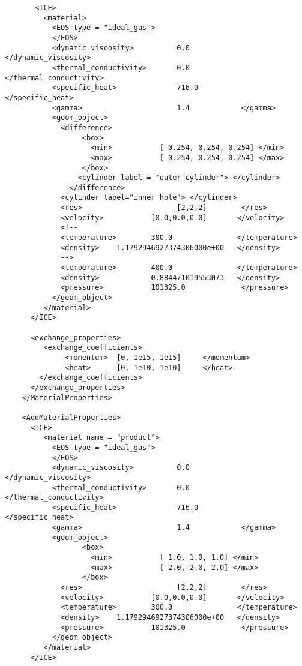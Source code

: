 \begin{lstlisting}
       <ICE>
         <material>
           <EOS type = "ideal_gas">
           </EOS>
           <dynamic_viscosity>          0.0            </dynamic_viscosity>
           <thermal_conductivity>       0.0            </thermal_conductivity>
           <specific_heat>              716.0          </specific_heat>
           <gamma>                      1.4            </gamma>
           <geom_object>
             <difference>
                  <box>
                    <min>           [-0.254,-0.254,-0.254] </min>
                    <max>           [ 0.254, 0.254, 0.254] </max>
                  </box>
                 <cylinder label = "outer cylinder"> </cylinder>
               </difference>
             <cylinder label="inner hole"> </cylinder>
             <res>                      [2,2,2]        </res>
             <velocity>           [0.0,0.0,0.0]       </velocity>
             <!--
             <temperature>        300.0               </temperature>
             <density>    1.1792946927374306000e+00   </density>
             -->
             <temperature>        400.0               </temperature>
             <density>            0.884471019553073   </density>
             <pressure>           101325.0             </pressure>
           </geom_object>
         </material>
      </ICE>       

      <exchange_properties>  
         <exchange_coefficients>
              <momentum>  [0, 1e15, 1e15]     </momentum>
              <heat>      [0, 1e10, 1e10]     </heat>
        </exchange_coefficients>
      </exchange_properties> 
    </MaterialProperties>

    <AddMaterialProperties>  
      <ICE>
         <material name = "product">
           <EOS type = "ideal_gas">
           </EOS>
           <dynamic_viscosity>          0.0            </dynamic_viscosity>
           <thermal_conductivity>       0.0            </thermal_conductivity>
           <specific_heat>              716.0          </specific_heat>
           <gamma>                      1.4            </gamma>
           <geom_object>
                  <box>
                    <min>           [ 1.0, 1.0, 1.0] </min>
                    <max>           [ 2.0, 2.0, 2.0] </max>
                  </box>
             <res>                      [2,2,2]        </res>
             <velocity>           [0.0,0.0,0.0]       </velocity>
             <temperature>        300.0               </temperature>
             <density>    1.1792946927374306000e+00   </density>
             <pressure>           101325.0             </pressure>
           </geom_object>
         </material>
      </ICE>


\end{lstlisting}
